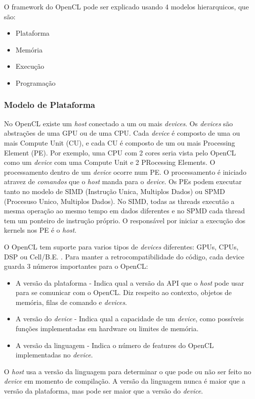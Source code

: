 O framework do OpenCL pode ser explicado usando 4 modelos hierarquicos, que são:
\begin{itemize}
  \item Plataforma
  \item Memória
  \item Execução
  \item Programação
\end{itemize}

\subsubsection{Modelo de Plataforma}
No OpenCL existe um \textit{host} conectado a um ou mais \textit{devices}. Os \textit{devices} são abstrações de uma GPU ou de uma CPU.
Cada \textit{device} é composto de uma ou mais Compute Unit (CU), e cada CU é composto de um ou mais Processing Element (PE). 
Por exemplo, uma CPU com 2 cores seria vista pelo OpenCL como um \textit{device} com uma Compute Unit e 2 PRocessing Elements. 
O processamento dentro de um \textit{device} ocorre num PE. O processamento é iniciado atravez de \textit{comandos} que o \textit{host} 
manda para o \textit{device}. Os PEs podem executar tanto no modelo de SIMD (Instrução Unica, Multiplos Dados) ou SPMD 
(Procesuso Unico, Multiplos Dados). No SIMD, todas as threads executão a mesma operação ao mesmo tempo em dados diferentes
e no SPMD cada thread tem um ponteiro de instrução próprio. O responsável por iniciar a execução dos kernels nos PE é o \textit{host}.

O OpenCL tem suporte para varios tipos de \textit{devices} diferentes: GPUs, CPUs, DSP ou Cell/B.E. .
Para manter a retrocompatibilidade do código, cada device guarda 3 números importantes para o OpenCL:
\begin{itemize} 
  \item A versão da plataforma - Indica qual a versão da API que o \textit{host} pode usar para se comunicar com o OpenCL.
        Diz respeito ao contexto, objetos de memória, filas de comando e \textit{devices}.
  \item A versão do \textit{device} - Indica qual a capacidade de um \textit{device}, como possíveis funções implementadas
        em hardware ou limites de memória.
  \item A versão da linguagem - Indica o número de features do OpenCL implementadas no \textit{device}.
\end{itemize}

O \textit{host} usa a versão da linguagem para determinar o que pode ou não ser feito no \textit{device} em momento de compilação.
A versão da linguagem nunca é maior que a versão da plataforma, mas pode ser maior que a versão do \textit{device}.

